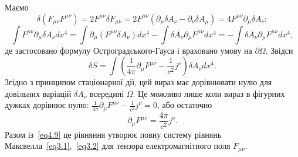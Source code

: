 Маємо
\begin{equation*}
\delta(F_{\mu\nu} F^{\mu\nu}) = 2 F^{\mu\nu} \delta F_{\mu\nu} = 2 F^{\mu\nu} (\partial_\mu \delta A_\nu - \partial_\nu \delta A_\mu) = 4 F^{\mu\nu} \partial_\mu \delta A_\nu;
\end{equation*}
\begin{equation*}
\int F^{\mu\nu} \partial_\mu \delta A_\nu dx^4 = \int \partial_\mu (F^{\mu\nu} \delta A_\nu) dx^4 - \int \delta A_\nu \partial_\mu F^{\mu\nu} dx^4 = - \int \delta A_\nu \partial_\mu F^{\mu\nu} dx^4,
\end{equation*}
де застосовано формулу Остроградського-Гауса і враховано умову на $\partial\Omega$. Звідси
\begin{equation*}
\delta S = \int \left( \frac{1}{4\pi} \partial_\mu F^{\mu\nu} - \frac{1}{c^2} j^\nu \right) \delta A_\nu dx^4.
\end{equation*}
Згідно з принципом стаціонарної дії, цей вираз має дорівнювати нулю для довільних варіацій $\delta A_\nu$ всередині $\Omega$. Це можливо лише коли вираз в фігурних дужках дорівнює нулю: $\frac{1}{4\pi} \partial_\mu F^{\mu\nu} - \frac{1}{c^2} j^\nu = 0$, або остаточно
\begin{equation}\label{eq4.12}
\partial_\mu F^{\mu\nu} = \frac{4\pi}{c^2} j^\nu.
\end{equation}
Разом із~\eqref{eq4.9} це рівняння утворює повну систему рівнянь Максвелла~\eqref{eq3.1},~\eqref{eq3.2} для тензора електромагнітного поля $F_{\mu\nu}$.
